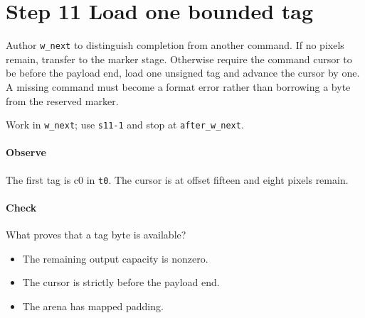 \section{Step 11 Load one bounded tag}\label{qoi-s11}
Author \texttt{w\_next} to distinguish completion from another command. If no pixels remain, transfer to the marker stage. Otherwise require the command cursor to be before the payload end, load one unsigned tag and advance the cursor by one. A missing command must become a format error rather than borrowing a byte from the reserved marker.

Work in \texttt{w\_next}; use \texttt{s11-1} and stop at \texttt{after\_w\_next}.

\paragraph{Observe} The first tag is c0 in \texttt{t0}. The cursor is at offset fifteen and eight pixels remain.

\paragraph{Check} What proves that a tag byte is available?
\begin{itemize}
\item[A.] The remaining output capacity is nonzero.
\item[B.] The cursor is strictly before the payload end.
\item[C.] The arena has mapped padding.
\end{itemize}
